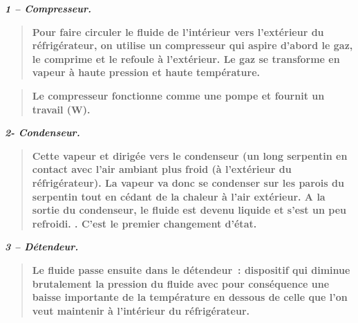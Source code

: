 \textbf{\textbf{}}

\textbf{}

\textbf{}

\textbf{}

\textbf{}

\textbf{}

\textbf{}

\textbf{}

\textbf{}

\textbf{}

\textbf{\textbf{}}

\textbf{}

\textbf{}

\textbf{}

\textbf{}

\textbf{}

\textbf{}

\textbf{}

\textbf{}

\textbf{}

\textbf{\emph{\textbf{1 -- Compresseur.}}}

\begin{quote}
\textbf{\textbf{Pour faire circuler le fluide de l'intérieur vers
l'extérieur du réfrigérateur, on utilise un compresseur qui aspire
d'abord le gaz, le comprime et le refoule à l'extérieur. Le gaz se
transforme en vapeur à haute pression et haute température. }}
\end{quote}

\begin{quote}
\textbf{\textbf{Le compresseur fonctionne comme une pompe et fournit un
travail (W).}}
\end{quote}

\textbf{\textbf{}\emph{\textbf{2- Condenseur.}}}

\begin{quote}
\textbf{\textbf{Cette vapeur et dirigée vers le condenseur (un long
serpentin en contact avec l'air ambiant plus froid (à l'extérieur du
réfrigérateur). La vapeur va donc se condenser sur les parois du
serpentin tout en cédant de la chaleur à l'air extérieur. A la sortie du
condenseur, le fluide est devenu liquide et s'est un peu refroidi. .
C'est le premier changement d'état.}}
\end{quote}

\textbf{\textbf{}\emph{\textbf{3 -- Détendeur.}}}

\begin{quote}
\textbf{\textbf{Le fluide passe ensuite dans le détendeur~: dispositif
qui diminue brutalement la pression du fluide avec pour conséquence une
baisse importante de la température en dessous de celle que l'on veut
maintenir à l'intérieur du réfrigérateur. }}
\end{quote}

